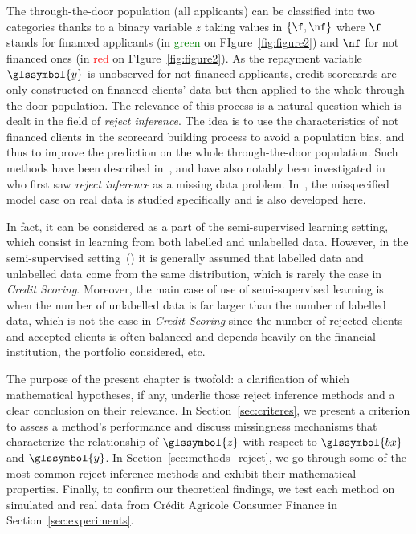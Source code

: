 The through-the-door population (all applicants) can be classified into two categories thanks to a binary variable $z$ taking values in $\{\f,\nf\}$ where $\f$ stands for financed applicants (in \textcolor{green}{green} on FIgure~\ref{fig:figure2}) and $\nf$ for not financed ones (in \textcolor{red}{red} on FIgure~\ref{fig:figure2}). As the repayment variable $\glssymbol{y}$ is unobserved for not financed applicants, credit scorecards are only constructed on financed clients' data but then applied to the whole  through-the-door population. The relevance of this process is a natural question which is dealt in the field of \textit{reject inference}. The idea is to use the characteristics of not financed clients in the scorecard building process to avoid a population bias, and thus to improve the prediction on the whole through-the-door population. Such methods have been described in~\cite{RI6,saporta,banasik,economix}, and have also notably been investigated in~\cite{RI2} who first saw \textit{reject inference} as a missing data problem. In~\cite{RI3}, the misspecified model case on real data is studied specifically and is also developed here.


In fact, it can be considered as a part of the semi-supervised learning setting, which consist in learning from both labelled and unlabelled data. However, in the semi-supervised setting~(\cite{ChaSchZie06}) it is generally assumed that labelled data and unlabelled data come from the same distribution, which is rarely the case in \textit{Credit Scoring}. Moreover, the main case of use of semi-supervised learning is when the number of unlabelled data is far larger than the number of labelled data, which is not the case in \textit{Credit Scoring} since the number of rejected clients and accepted clients is often balanced and depends heavily on the financial institution, the portfolio considered, etc.


The purpose of the present chapter is twofold: a clarification of which mathematical hypotheses, if any, underlie those reject inference methods and a clear conclusion on their relevance. In Section~\ref{sec:criteres}, we present a criterion to assess a method's performance and discuss missingness mechanisms that characterize the relationship of $\glssymbol{z}$ with respect to $\glssymbol{bx}$ and $\glssymbol{y}$. In Section~\ref{sec:methods_reject}, we go through some of the most common reject inference methods and exhibit their mathematical properties. Finally, to confirm our theoretical findings, we test each method on simulated and real data from Crédit Agricole Consumer Finance in Section~\ref{sec:experiments}.

